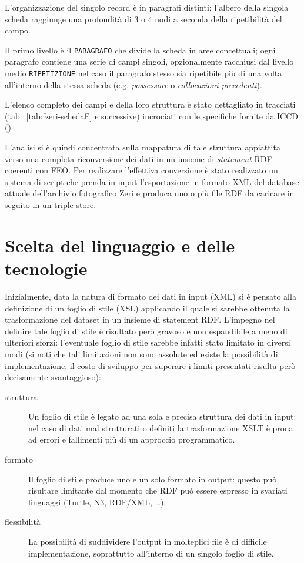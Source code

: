 L'organizzazione del singolo record è in paragrafi distinti; l'albero della singola scheda raggiunge una profondità di 3 o 4 nodi a seconda della ripetibilità del campo.

Il primo livello è il \texttt{PARAGRAFO} che divide la scheda in aree concettuali; ogni paragrafo contiene una serie di campi singoli, opzionalmente racchiusi dal livello medio \texttt{RIPETIZIONE} nel caso il paragrafo stesso sia ripetibile più di una volta all'interno della stessa scheda (e.g. \emph{possessore} o \emph{collocazioni precedenti}).

L'elenco completo dei campi e della loro struttura è stato dettagliato in tracciati (tab.~\ref{tab:fzeri-schedaF} e successive) incrociati con le specifiche fornite da ICCD (\cite{14,15})

L'analisi si è quindi concentrata sulla mappatura di tale struttura appiattita verso una completa riconversione dei dati in un insieme di \emph{statement} RDF coerenti con FEO. Per realizzare l'effettiva conversione è stato realizzato un sistema di script che prenda in input l'esportazione in formato XML del database attuale dell'archivio fotografico Zeri e produca uno o più file RDF da caricare in seguito in un triple store.

\section{Scelta del linguaggio e delle tecnologie}

Inizialmente, data la natura di formato dei dati in input (XML) si è pensato alla definizione di un foglio di stile (XSL) applicando il quale si sarebbe ottenuta la trasformazione del dataset in un insieme di statement RDF. L'impegno nel definire tale foglio di stile è risultato però gravoso e non espandibile a meno di ulteriori sforzi: l'eventuale foglio di stile sarebbe infatti stato limitato in diversi modi (si noti che tali limitazioni non sono assolute ed esiste la possibilità di implementazione, il costo di sviluppo per superare i limiti presentati risulta però decisamente svantaggioso):
\begin{description}
\item[struttura] Un foglio di stile è legato ad una sola e precisa struttura dei dati in input: nel caso di dati mal strutturati o definiti la trasformazione XSLT è prona ad errori e fallimenti più di un approccio programmatico.
\item[formato] Il foglio di stile produce uno e un solo formato in output: questo può risultare limitante dal momento che RDF può essere espresso in svariati linguaggi (Turtle, N3, RDF/XML, \ldots).
\item[flessibilità] La possibilità di suddividere l'output in molteplici file è di difficile implementazione, soprattutto all'interno di un singolo foglio di stile.
\end{description}

